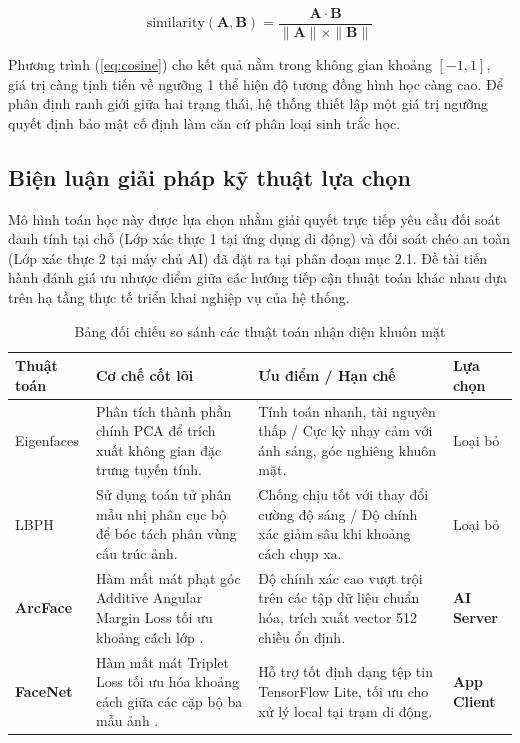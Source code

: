 \documentclass[../DoAn.tex]{subfiles}
\begin{document}
\begin{equation}
\label{eq:cosine}
    \text{similarity}(\mathbf{A}, \mathbf{B}) = \frac{\mathbf{A} \cdot \mathbf{B}}{\|\mathbf{A}\| \times \|\mathbf{B}\|}
\end{equation}

Phương trình (\ref{eq:cosine}) cho kết quả nằm trong không gian khoảng $[-1, 1]$, giá trị càng tịnh tiến về ngưỡng 1 thể hiện độ tương đồng hình học càng cao. Để phân định ranh giới giữa hai trạng thái, hệ thống thiết lập một giá trị ngưỡng quyết định bảo mật cố định làm căn cứ phân loại sinh trắc học.

\subsection{Biện luận giải pháp kỹ thuật lựa chọn}

Mô hình toán học này được lựa chọn nhằm giải quyết trực tiếp yêu cầu đối soát danh tính tại chỗ (Lớp xác thực 1 tại ứng dụng di động) và đối soát chéo an toàn (Lớp xác thực 2 tại máy chủ AI) đã đặt ra tại phân đoạn mục 2.1. Đề tài tiến hành đánh giá ưu nhược điểm giữa các hướng tiếp cận thuật toán khác nhau dựa trên hạ tầng thực tế triển khai nghiệp vụ của hệ thống.

\begin{table}[ht!]
\centering
\small
\renewcommand{\arraystretch}{1.3}
\caption{Bảng đối chiếu so sánh các thuật toán nhận diện khuôn mặt}
\label{tab:face_comparison}
\begin{tabular}{|>{\raggedright\arraybackslash}p{2.3cm}|>{\raggedright\arraybackslash}p{4.5cm}|>{\raggedright\arraybackslash}p{5.5cm}|>{\centering\arraybackslash}p{1.7cm}|}
\hline
\textbf{Thuật toán} & \textbf{Cơ chế cốt lõi} & \textbf{Ưu điểm / Hạn chế} & \textbf{Lựa chọn} \\ \hline
Eigenfaces & Phân tích thành phần chính PCA để trích xuất không gian đặc trưng tuyến tính. & Tính toán nhanh, tài nguyên thấp / Cực kỳ nhạy cảm với ánh sáng, góc nghiêng khuôn mặt. & Loại bỏ \\ \hline
LBPH & Sử dụng toán tử phân mẫu nhị phân cục bộ để bóc tách phân vùng cấu trúc ảnh. & Chống chịu tốt với thay đổi cường độ sáng / Độ chính xác giảm sâu khi khoảng cách chụp xa. & Loại bỏ \\ \hline
\textbf{ArcFace} & Hàm mất mát phạt góc Additive Angular Margin Loss tối ưu khoảng cách lớp \cite{insightface2021}. & Độ chính xác cao vượt trội trên các tập dữ liệu chuẩn hóa, trích xuất vector 512 chiều ổn định. & \textbf{AI Server} \\ \hline
\textbf{FaceNet} & Hàm mất mát Triplet Loss tối ưu hóa khoảng cách giữa các cặp bộ ba mẫu ảnh \cite{facenet2015}. & Hỗ trợ tốt định dạng tệp tin TensorFlow Lite, tối ưu cho xử lý local tại trạm di động. & \textbf{App Client} \\ \hline
\end{tabular}
\end{table}
\end{document}
